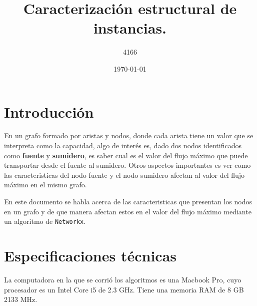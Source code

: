 \documentclass{article}
\title{Caracterización estructural de instancias.}
\author{4166}
\date{\today}
\begin{document}
\maketitle
\section*{Introducción}
En un grafo formado por aristas y nodos, donde cada arista tiene un valor que se interpreta como la capacidad, algo de interés es, dado dos nodos identificados como \textbf{fuente} y \textbf{sumidero}, es saber cual es el valor del flujo máximo que puede transportar desde el fuente al sumidero. Otros aspectos importantes es ver como las caracteristicas del nodo fuente y el nodo sumidero afectan al valor del flujo máximo en el mismo grafo.

En este documento se habla acerca de las caracteristicas que presentan los nodos en un grafo y de que manera afectan estos en el valor del flujo máximo mediante un algoritmo de \texttt{Networkx}.

\section*{Especificaciones técnicas}
La computadora en la que se corrió los algoritmos es una Macbook Pro, cuyo procesador es un Intel Core i5 de 2.3 GHz. Tiene una memoria RAM de 8 GB 2133 MHz.
\end{document}
